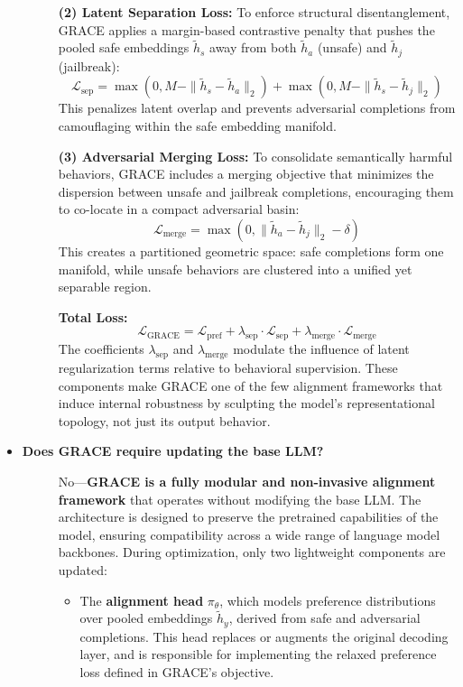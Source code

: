 \begin{itemize}[leftmargin=15pt,nolistsep]
\begin{description}
\textbf{(2) Latent Separation Loss:}  
To enforce structural disentanglement, GRACE applies a margin-based contrastive penalty that pushes the pooled safe embeddings \(\tilde{h}_s\) away from both \(\tilde{h}_a\) (unsafe) and \(\tilde{h}_j\) (jailbreak):
\[
\mathcal{L}_{\text{sep}} = 
\max(0, M - \|\tilde{h}_s - \tilde{h}_a\|_2) +
\max(0, M - \|\tilde{h}_s - \tilde{h}_j\|_2)
\]
This penalizes latent overlap and prevents adversarial completions from camouflaging within the safe embedding manifold.

\textbf{(3) Adversarial Merging Loss:}  
To consolidate semantically harmful behaviors, GRACE includes a merging objective that minimizes the dispersion between unsafe and jailbreak completions, encouraging them to co-locate in a compact adversarial basin:
\[
\mathcal{L}_{\text{merge}} =
\max(0, \|\tilde{h}_a - \tilde{h}_j\|_2 - \delta)
\]
This creates a partitioned geometric space: safe completions form one manifold, while unsafe behaviors are clustered into a unified yet separable region.

\textbf{Total Loss:}
\[
\mathcal{L}_{\text{GRACE}} = 
\mathcal{L}_{\text{pref}} + 
\lambda_{\text{sep}} \cdot \mathcal{L}_{\text{sep}} + 
\lambda_{\text{merge}} \cdot \mathcal{L}_{\text{merge}}
\]
The coefficients \(\lambda_{\text{sep}}\) and \(\lambda_{\text{merge}}\) modulate the influence of latent regularization terms relative to behavioral supervision. These components make GRACE one of the few alignment frameworks that induce internal robustness by sculpting the model’s representational topology, not just its output behavior.

\end{description}

\item[\ding{93}] { \selectfont \textbf{Does GRACE require updating the base LLM?}}
\begin{description}
\item[] No—\textbf{GRACE is a fully modular and non-invasive alignment framework} that operates without modifying the base LLM. The architecture is designed to preserve the pretrained capabilities of the model, ensuring compatibility across a wide range of language model backbones. During optimization, only two lightweight components are updated:

\begin{itemize}
    \item The \textbf{alignment head} \(\pi_\theta\), which models preference distributions over pooled embeddings \(\tilde{h}_y\), derived from safe and adversarial completions. This head replaces or augments the original decoding layer, and is responsible for implementing the relaxed preference loss defined in GRACE's objective.
    

\end{itemize}
\end{description}
\end{itemize}
